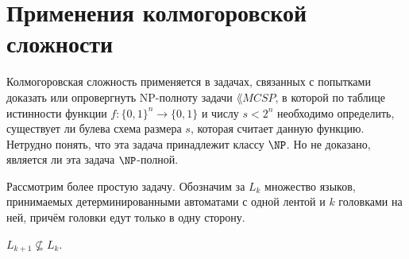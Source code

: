 \section{Применения колмогоровской сложности}

Колмогоровская сложность применяется в задачах, связанных с попытками доказать или опровергнуть
$\mathrm{NP}$-полноту задачи $\lang{MCSP}$, в которой по таблице истинности функции $f\colon \{0, 1\}^n
\to \{0, 1\}$ и числу $s < 2^n$ необходимо определить, существует ли булева схема размера $s$, которая
считает данную функцию. Нетрудно понять, что эта задача принадлежит классу $\NP$. Но не доказано,
является ли эта задача $\NP$-полной.  

Рассмотрим более простую задачу. Обозначим за $L_k$ множество языков, принимаемых детерминированными
автоматами с одной лентой и $k$ головками на ней, причём головки едут только в одну сторону. 

\begin{proposition}
    $L_{k + 1} \nsubseteq L_{k}$.
\end{proposition}

